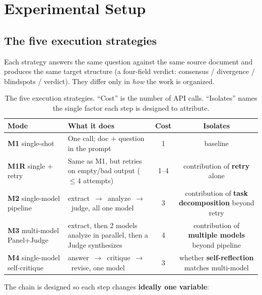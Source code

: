 \documentclass[11pt]{article}
\begin{document}
\section{Experimental Setup}
\label{sec:setup}

\subsection{The five execution strategies}

Each strategy answers the same question against the same source document and
produces the same target structure (a four-field verdict: consensus /
divergence / blindspots / verdict). They differ only in \emph{how} the work is
organized.

\begin{table}[ht!]
\centering
\small
\renewcommand{\arraystretch}{1.15}
\caption{The five execution strategies. ``Cost'' is the number of API calls.
``Isolates'' names the single factor each step is designed to attribute.}
\label{tab:modes}
\begin{tabularx}{\textwidth}{@{}p{2.5cm}Xcc@{}}
\toprule
\textbf{Mode} & \textbf{What it does} & \textbf{Cost} & \textbf{Isolates} \\
\midrule
\textbf{M1} single-shot & One call; doc + question in the prompt & 1 & baseline \\
\textbf{M1R} single + retry & Same as M1, but retries on empty/bad output ($\leq$4 attempts) & 1--4 & contribution of \textbf{retry} alone \\
\textbf{M2} single-model pipeline & extract~$\rightarrow$~analyze~$\rightarrow$~judge, all one model & 3 & contribution of \textbf{task decomposition} beyond retry \\
\textbf{M3} multi-model Panel+Judge & extract, then 2 models analyze in parallel, then a Judge synthesizes & 4 & contribution of \textbf{multiple models} beyond pipeline \\
\textbf{M4} single-model self-critique & answer~$\rightarrow$~critique~$\rightarrow$~revise, one model & 3 & whether \textbf{self-reflection} matches multi-model \\
\bottomrule
\end{tabularx}
\end{table}

The chain is designed so each step changes \textbf{ideally one variable}:
\end{document}
